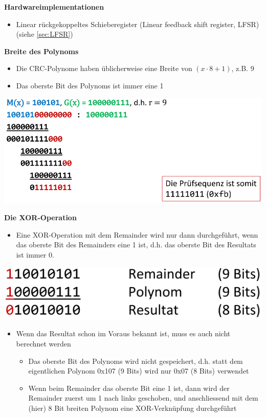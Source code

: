 \textbf{Hardwareimplementationen}
\begin{itemize}
	\item Linear rückgekoppeltes Schieberegister (Linear feedback shift register, LFSR) (siehe \ref{sec:LFSR})
\end{itemize}

\textbf{Breite des Polynoms}
\begin{multicols}{2}
\begin{itemize}
	\item Die CRC-Polynome haben üblicherweise eine Breite von $(x \cdot 8 + 1)$, z.B. 9
	\item Das oberste Bit des Polynoms ist immer eine 1
\end{itemize}
\vfill\null
\columnbreak
\begin{center}
\includegraphics[width=0.8\linewidth]{images/CRC/polynomBreite}
\end{center}
\end{multicols}

\textbf{Die XOR-Operation}
\begin{multicols}{2}
\begin{itemize}
	\item Eine XOR-Operation mit dem Remainder wird nur dann durchgeführt, wenn das oberste Bit des Remainders eine 1 ist, d.h. das oberste Bit des Resultats ist	immer 0.
\end{itemize}
\vfill\null
\columnbreak
\includegraphics[width=0.8\linewidth]{images/CRC/xor}
\end{multicols}
\begin{itemize}
\item Wenn das Resultat schon im Voraus bekannt ist, muss es auch nicht berechnet werden
\begin{itemize}
	\item Das oberste Bit des Polynoms wird nicht gespeichert, d.h. statt dem eigentlichen Polynom 0x107 (9 Bits) wird nur 0x07 (8 Bits) verwendet
	\item Wenn beim Remainder das oberste Bit eine 1 ist, dann wird der Remainder zuerst um 1 nach links geschoben, und anschliessend mit dem (hier) 8 Bit breiten Polynom eine XOR-Verknüpfung durchgeführt
\end{itemize}
\end{itemize}

